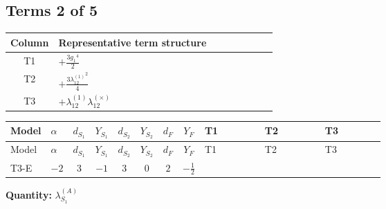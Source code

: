 \documentclass[8pt]{article}
\begin{document}
\begin{landscape}
\subsection*{Terms 2 of 5}
\begin{center}
\begin{tabular}{@{}c >{\raggedright\arraybackslash}p{0.82\linewidth}@{}}
\toprule
Column & Representative term structure \\
\midrule
T1 & \(\displaystyle +\frac{3 {g_1}^4}{2}\) \\
\midrule
T2 & \(\displaystyle +\frac{3 {\lambda_{12}^{(1)}}^2}{4}\) \\
\midrule
T3 & \(\displaystyle +{\lambda_{12}^{(1)}} {\lambda_{12}^{(\times)}}\) \\
\midrule
\bottomrule
\end{tabular}
\end{center}
\smallskip
\tiny
\begin{longtable}{@{}llcccccc >{\raggedright\arraybackslash}p{0.21\linewidth} >{\raggedright\arraybackslash}p{0.21\linewidth} >{\raggedright\arraybackslash}p{0.21\linewidth}@{}}
\toprule
Model & $\alpha$ & $d_{S_1}$ & $Y_{S_1}$ & $d_{S_2}$ & $Y_{S_2}$ & $d_F$ & $Y_F$ & T1 & T2 & T3 \\
\midrule
\endfirsthead
\toprule
Model & $\alpha$ & $d_{S_1}$ & $Y_{S_1}$ & $d_{S_2}$ & $Y_{S_2}$ & $d_F$ & $Y_F$ & T1 & T2 & T3 \\
\midrule
\endhead
T3-E & $-2$ & $3$ & $-1$ & $3$ & $0$ & $2$ & $-\frac{1}{2}$ & \scriptsize\adjustbox{max width=\linewidth}{$\begin{gathered} +\frac{3 {g_1}^4}{2}\end{gathered}$} & \scriptsize\adjustbox{max width=\linewidth}{$\begin{gathered} +\frac{3 {\lambda_{12}^{(1)}}^2}{4}\end{gathered}$} & \scriptsize\adjustbox{max width=\linewidth}{$\begin{gathered} +{\lambda_{12}^{(1)}} {\lambda_{12}^{(\times)}}\end{gathered}$} \\
\midrule
\bottomrule
\end{longtable}
\clearpage
\noindent\textbf{Quantity: }$\lambda_{S_1}^{(A)}$\par\smallskip

\end{landscape}
\end{document}

